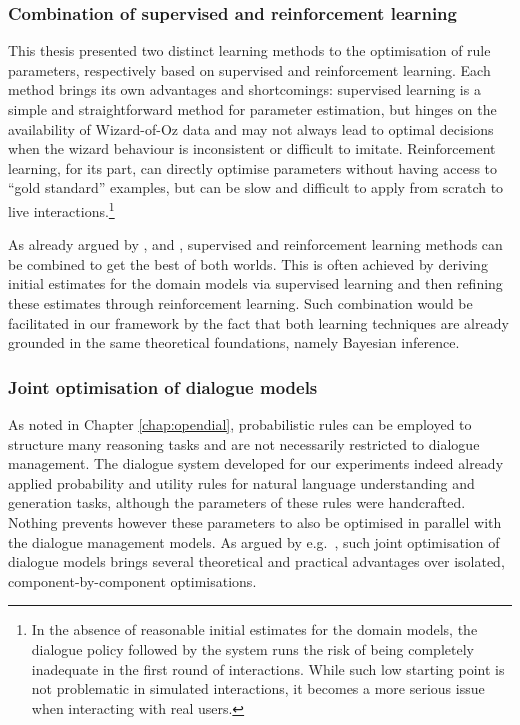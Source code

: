 \subsubsection*{Combination of supervised and reinforcement learning}

This thesis presented two distinct learning methods to the optimisation of rule parameters, respectively based on supervised and reinforcement learning.  Each method brings its own advantages and shortcomings: supervised learning is a simple and straightforward method for parameter estimation, but hinges on the availability of Wizard-of-Oz data and may not always lead to optimal decisions when the wizard behaviour is inconsistent or difficult to imitate.  Reinforcement learning, for its part, can directly optimise parameters without having access to ``gold standard'' examples, but can be slow and difficult to apply from scratch to live interactions.\footnote{In the absence of reasonable initial estimates for the domain models, the dialogue policy followed by the system runs the risk of being completely inadequate in the first round of interactions.  While such low starting point is not problematic in simulated interactions, it becomes a more serious issue when interacting with real users.} 

As already argued by \cite{williams2003}, \cite{rieser2006} and \cite{Henderson:2008}, supervised and reinforcement learning methods can be combined to get the best of both worlds. This is often achieved by deriving initial estimates for the domain models via supervised learning and then refining these estimates through reinforcement learning. Such combination would be facilitated in our framework by the fact that both learning techniques are already grounded in the same theoretical foundations, namely Bayesian inference. 

\subsubsection*{Joint optimisation of dialogue models}

As noted in Chapter \ref{chap:opendial}, probabilistic rules can be employed to structure many reasoning tasks and are not necessarily restricted to dialogue management. The dialogue system developed for our experiments indeed already applied probability and utility rules for natural language understanding and generation tasks, although the parameters of these rules were handcrafted. Nothing prevents however these parameters to also be optimised in parallel with the dialogue management models. As argued by e.g.\ \cite{Lemon:2011}, such joint optimisation of dialogue models brings several theoretical and practical advantages over isolated, component-by-component optimisations.

